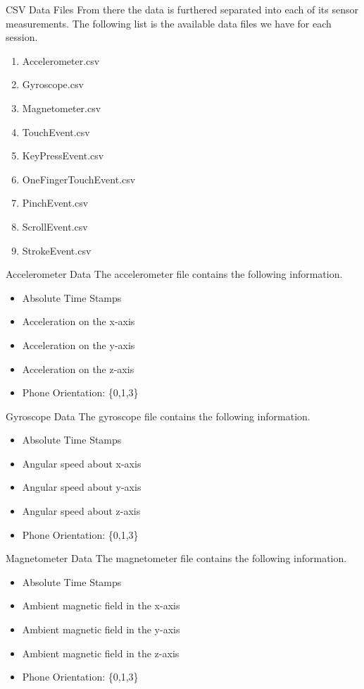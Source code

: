 \documentclass[10pt]{beamer}
\begin{document}
\begin{frame} {CSV Data Files}
From there the data is furthered separated into each of its sensor measurements. The following list is the available data files we have for each session. 
\begin{enumerate}
\item Accelerometer.csv
\item Gyroscope.csv
\item Magnetometer.csv
\item TouchEvent.csv
\item KeyPressEvent.csv
\item OneFingerTouchEvent.csv
\item PinchEvent.csv
\item ScrollEvent.csv
\item StrokeEvent.csv
\end{enumerate}
\end{frame}

\begin{frame} {Accelerometer Data}
The accelerometer file contains the following information.
\begin{itemize}
\item Absolute Time Stamps
\item Acceleration on the x-axis
\item Acceleration on the y-axis
\item Acceleration on the z-axis
\item Phone Orientation: \{0,1,3\}
\end{itemize}
\end{frame}

\begin{frame} {Gyroscope Data}
The gyroscope file contains the following information.
\begin{itemize}
\item Absolute Time Stamps
\item Angular speed about x-axis
\item Angular speed about y-axis
\item Angular speed about z-axis
\item Phone Orientation: \{0,1,3\}
\end{itemize}
\end{frame}

\begin{frame} {Magnetometer Data}
The magnetometer file contains the following information.
\begin{itemize}
\item Absolute Time Stamps
\item Ambient magnetic field in the x-axis
\item Ambient magnetic field in the y-axis
\item Ambient magnetic field in the z-axis
\item Phone Orientation: \{0,1,3\}
\end{itemize}
\end{frame}
\end{document}
